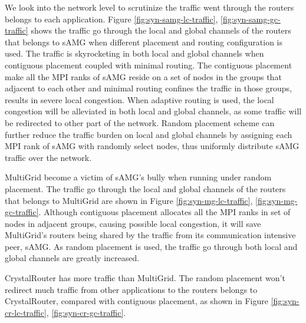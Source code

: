 \documentclass[conference,compsoc]{IEEEtran}
\begin{document}
We look into the network level to scrutinize the traffic went through the routers belongs to each application. 
Figure \ref{fig:syn-samg-lc-traffic}, \ref{fig:syn-samg-gc-traffic} shows the traffic go through the local and global channels of the routers that belongs to sAMG when different placement and routing configuration is used. The traffic is skyrocketing in both local and global channels when contiguous placement coupled with minimal routing. The contiguous placement make all the MPI ranks of sAMG reside on a set of nodes in the groups that adjacent to each other and minimal routing confines the traffic in those groups, results in severe local congestion. When adaptive routing is used, the local congestion will be alleviated in both local and global channels, as some traffic will be redirected to other part of the network. Random placement scheme can further reduce the traffic burden on local and global channels by assigning each MPI rank of sAMG with randomly select nodes, thus uniformly distribute sAMG traffic over the network. 

MultiGrid become a victim of sAMG's bully when running under random placement. The traffic go through the local and global channels of the routers that belongs to MultiGrid are shown in Figure \ref{fig:syn-mg-lc-traffic}, \ref{fig:syn-mg-gc-traffic}. Although contiguous placement allocates all the MPI ranks in set of nodes in adjacent groups, causing possible local congestion, it will save MultiGrid's routers being shared by the traffic from its communication intensive peer, sAMG. As random placement is used, the traffic go through both local and global channels are greatly increased. 

CrystalRouter has more traffic than MultiGrid. The random placement won't redirect much traffic from other applications to the routers belongs to CrystalRouter, compared with contiguous placement, as shown in Figure \ref{fig:syn-cr-lc-traffic}, \ref{fig:syn-cr-gc-traffic}.
\end{document}
